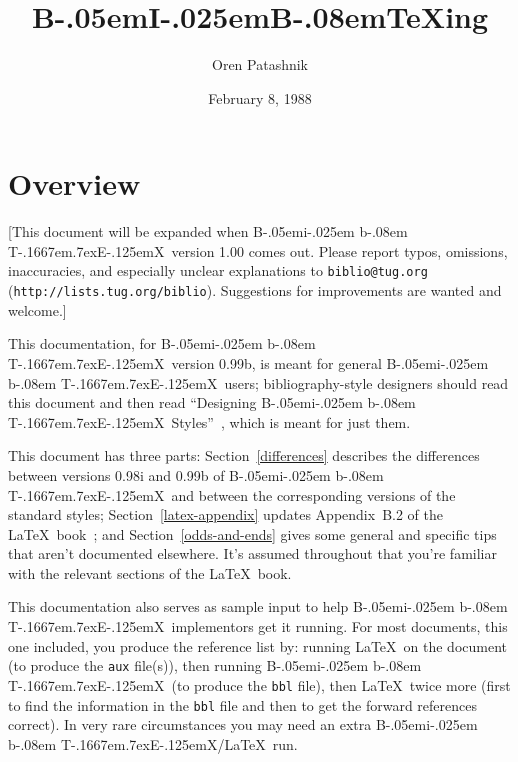 
\def\BibTeX{{\rm B\kern-.05em{\sc i\kern-.025em b}\kern-.08em
    T\kern-.1667em\lower.7ex\hbox{E}\kern-.125emX}}

\title{B\kern-.05em{\large I}\kern-.025em{\large B}\kern-.08em\TeX ing}
\author{Oren Patashnik}
\date{February 8, 1988}



\maketitle

\section{Overview}

[This document will be expanded when \BibTeX\ version 1.00 comes out.
Please report typos, omissions, inaccuracies,
and especially unclear explanations
to {\tt biblio@tug.org} ({\tt http://lists.tug.org/biblio}).
Suggestions for improvements are wanted and welcome.]

This documentation, for \BibTeX\ version 0.99b,
is meant for general \BibTeX\ users;
bibliography-style designers should read this document
and then read ``Designing \BibTeX\ Styles''~\cite{btxhak},
which is meant for just them.

This document has three parts:
Section~\ref{differences}
describes the differences between versions 0.98i and 0.99b
of \BibTeX\ and between the corresponding versions of the standard styles;
Section~\ref{latex-appendix}
updates Appendix~B.2 of the \LaTeX\ book~\cite{latex};
and Section~\ref{odds-and-ends}
gives some general and specific tips
that aren't documented elsewhere.
It's assumed throughout that you're familiar with
the relevant sections of the \LaTeX\ book.

This documentation also serves as sample input to help
\BibTeX\ implementors get it running.
For most documents, this one included, you produce the reference list by:
running \LaTeX\ on the document (to produce the {\tt aux} file(s)),
then running \BibTeX\ (to produce the {\tt bbl} file),
then \LaTeX\ twice more (first to find the information in the {\tt bbl} file
and then to get the forward references correct).
In very rare circumstances you may need an extra \BibTeX/\LaTeX\ run.


